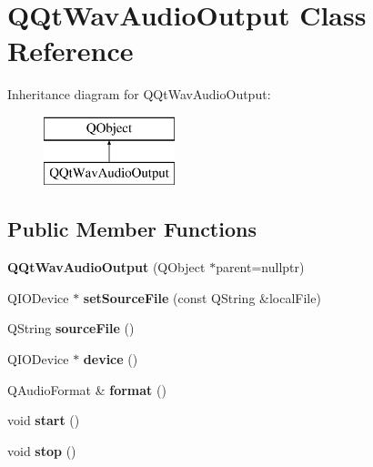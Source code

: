 \hypertarget{class_q_qt_wav_audio_output}{}\section{Q\+Qt\+Wav\+Audio\+Output Class Reference}
\label{class_q_qt_wav_audio_output}
Inheritance diagram for Q\+Qt\+Wav\+Audio\+Output\+:\begin{figure}[H]
\begin{center}
\leavevmode
\includegraphics[height=2.000000cm]{class_q_qt_wav_audio_output}
\end{center}
\end{figure}
\subsection*{Public Member Functions}
\begin{DoxyCompactItemize}
\item 
\mbox{\label{class_q_qt_wav_audio_output_ab850b1e224bf1a8d5185e5ca94258044}} 
{\bfseries Q\+Qt\+Wav\+Audio\+Output} (Q\+Object $\ast$parent=nullptr)
\item 
\mbox{\label{class_q_qt_wav_audio_output_a1f60d5a21a8ad52a588219b2977f06bb}} 
Q\+I\+O\+Device $\ast$ {\bfseries set\+Source\+File} (const Q\+String \&local\+File)
\item 
\mbox{\label{class_q_qt_wav_audio_output_ac102d32aeb3d071f03a6c4d20f65111c}} 
Q\+String {\bfseries source\+File} ()
\item 
\mbox{\label{class_q_qt_wav_audio_output_a270e096a083dcb4f724d8de148775c40}} 
Q\+I\+O\+Device $\ast$ {\bfseries device} ()
\item 
\mbox{\label{class_q_qt_wav_audio_output_aa91a0f413fdd7c5ccabe2f6da7648dc5}} 
Q\+Audio\+Format \& {\bfseries format} ()
\item 
\mbox{\label{class_q_qt_wav_audio_output_a7ec4a49d961c93a094dcd17913101bf3}} 
void {\bfseries start} ()
\item 
\mbox{\label{class_q_qt_wav_audio_output_a0b25a79fe92e980dd081b859a60a7753}} 
void {\bfseries stop} ()
\end{DoxyCompactItemize}
